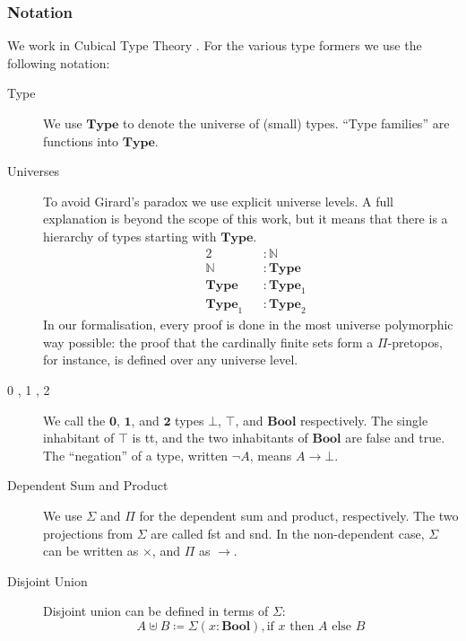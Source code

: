 \subsubsection{Notation}
We work in Cubical Type Theory \cite{cohenCubicalTypeTheory2016}.
For the various type formers we use the following notation:
\begin{description}
  \item[Type] We use \(\mathbf{Type}\) to denote the universe of (small) types.
    ``Type families'' are functions into \(\mathbf{Type}\).
  \item[Universes]
    To avoid Girard's paradox
    \cite{girardInterpretationFonctionelleElimination1972} we use explicit
    universe levels.
    A full explanation is beyond the scope of this work, but it means that there
    is a hierarchy of types starting with \(\mathbf{Type}\).
    \begin{equation}
      \begin{alignat}{3}
        & 2               &&: \mathbb{N} \\
        & \mathbb{N}      &&: \mathbf{Type} \\
        & \mathbf{Type}   &&: \mathbf{Type}_1 \\
        & \mathbf{Type}_1 &&: \mathbf{Type}_2
      \end{alignat}
    \end{equation}
    In our formalisation, every proof is done in the most universe polymorphic
    way possible: the proof that the cardinally finite sets form a
    \(\Pi\)-pretopos, for instance, is defined over any universe level.
  \item[0 , 1 , 2] We call the \(\mathbf{0}\), \(\mathbf{1}\), and
    \(\mathbf{2}\) types \(\bot\), \(\top\), and \(\mathbf{Bool}\) respectively.
    The single inhabitant of \(\top\) is tt, and the two inhabitants of
    \(\mathbf{Bool}\) are false and true.
    The ``negation'' of a type, written \(\neg A\), means \(A \rightarrow
    \bot\).
  \item[Dependent Sum and Product] We use \(\Sigma\) and \(\Pi\) for the
    dependent sum and product, respectively.
    The two projections from \(\Sigma\) are called fst and snd.
    In the non-dependent case, \(\Sigma\) can be written as \(\times\), and
    \(\Pi\) as \(\rightarrow\).
  \item[Disjoint Union] Disjoint union can be defined in terms of \(\Sigma\):
    \begin{equation}
      A \uplus B \coloneqq \Sigma(x : \mathbf{Bool}) , \text{if } x \text{ then } A \text{ else } B

\end{equation}
\end{description}
